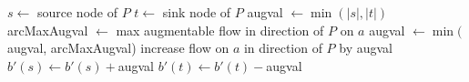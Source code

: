 \begin{algorithm}
 \begin{algorithmic}
    \State $s \gets $ source node of $P$
    \State $t \gets $ sink node of $P$
    \State augval $\gets \min(|s|,|t|)$
      \State arcMaxAugval $\gets$ max augmentable flow in direction of $P$ on $a$ 
      \State augval $\gets \min($augval, arcMaxAugval)
    \EndFor
      \State increase flow on $a$ in direction of $P$ by augval
    \EndFor
    \State $b'(s) \gets b'(s) + $augval
    \State $b'(t) \gets b'(t) - $augval
  \EndFunction
 \end{algorithmic}
 
\end{algorithm}

